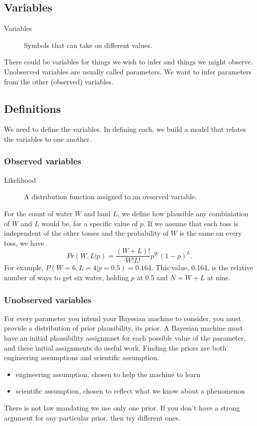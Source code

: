 \documentclass[11pt]{article}
\begin{document}
\subsection{Variables}
\label{sec:org0fcdb74}
\begin{description}
\item[{Variables}] Symbols that can take on different values.
\end{description}
There could be variables for things we wish to infer and things we might observe.
Unobserved variables are usually called parameters. We want to infer parameters
from the other (observed) variables.
\subsection{Definitions}
\label{sec:orgf72be6d}
We need to define the variables. In defining each, we build a model that relates
the variables to one another.
\subsubsection{Observed variables}
\label{sec:org4c50e9b}
\begin{description}
\item[{Likelihood}] A distribution function assigned to an ovserved variable.
\end{description}

For the count of water \(W\) and land \(L\), we define how plausible any
combiniation of \(W\) and \(L\) would be, for a specific value of \(p\). If we assume
that each toss is independent of the other tosses and the probability of \(W\) is
the same on every toss, we have
$$
Pr(W, L | p) = \frac{(W + L)!}{W!L!}p^W(1-p)^L.
$$
For example, \(P(W=6, L=4 | p=0.5) = 0.164\). This value, 0.164, is the relative
number of ways to get six water, holding \(p\) at 0.5 and \(N = W + L\) at nine.
\subsubsection{Unobserved variables}
\label{sec:orgfc23b8f}
For every parameter you intend your Bayesian machine to consider, you must
provide a distribution of prior plausibility, its prior. A Bayesian machine must
have an initial plausibility assignmnet for each possible value of the
parameter, and these initial assignments do useful work.
Finding the priors are both engineering assumptions and scientific assumption.
\begin{itemize}
\item engineering assumption, chosen to help the machine to learn
\item scientific assumption, chosen to reflect what we know about a phenomenon
\end{itemize}
There is not law mandating we use only one prior. If you don't have a strong
argument for any particular prior, then try different ones.
\end{document}
